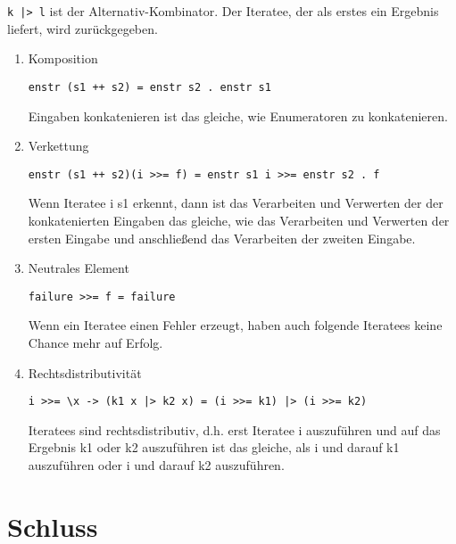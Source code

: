 \documentclass[draft=false
              ,paper=a4
              ,twoside=false
              ,fontsize=11pt
              ,headsepline
              ,BCOR10mm
              ,DIV11
              ]{scrbook}
\begin{document}
\lstinline!k |> l! ist der Alternativ-Kombinator. Der Iteratee, der als erstes ein Ergebnis liefert, wird zurückgegeben.

\begin{enumerate}
  \item Komposition
    \begin{lstlisting}
enstr (s1 ++ s2) = enstr s2 . enstr s1
    \end{lstlisting}

    Eingaben konkatenieren ist das gleiche, wie Enumeratoren zu konkatenieren.

  \item Verkettung
    \begin{lstlisting}
enstr (s1 ++ s2)(i >>= f) = enstr s1 i >>= enstr s2 . f
    \end{lstlisting}

    Wenn Iteratee i s1 erkennt, dann ist das Verarbeiten und Verwerten der der konkatenierten Eingaben das gleiche, wie das Verarbeiten und Verwerten der ersten Eingabe und anschließend das Verarbeiten der zweiten Eingabe.

  \item Neutrales Element
    \begin{lstlisting}
failure >>= f = failure
    \end{lstlisting}

    Wenn ein Iteratee einen Fehler erzeugt, haben auch folgende Iteratees keine Chance mehr auf Erfolg.

  \item Rechtsdistributivität
    \begin{lstlisting}
i >>= \x -> (k1 x |> k2 x) = (i >>= k1) |> (i >>= k2)
    \end{lstlisting}

    Iteratees sind rechtsdistributiv, d.h. erst Iteratee i auszuführen und auf das Ergebnis k1 oder k2 auszuführen ist das gleiche, als i und darauf k1 auszuführen oder i und darauf k2 auszuführen.
\end{enumerate}











\chapter{Schluss} %
\label{cha:schluss}
\end{document}
